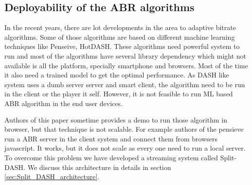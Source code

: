 \subsection{Deployability of the ABR algorithms}
In the recent years, there are lot developments in the area to adaptive bitrate algorithms. Some of those algorithms are based on different machine learning techniques like Penseive, HotDASH. These algorithms need powerful system to run and most of the algorithms have several library dependency which might not available is all the platform, specially smartphone and browsers. Most of the time it also need a trained model to get the optimal performance. As DASH like system uses a dumb server server and smart client, the algorithm need to be run in the client or the player it self. However, it is not feasible to run ML based ABR algorithm in the end user devices. 

Authors of this paper sometime provides a demo to run those algorithm in browser, but that technique is not scalable. For example authors of the pensieve run a ABR server in the client system and connect them from browsers javascript. It works, but it does not scale as every one need to run a local server. To overcome this problem we have developed a streaming system called Split-DASH. We discuss this architecture in details in section \ref{sec:Split_DASH_architecture}. 


 


